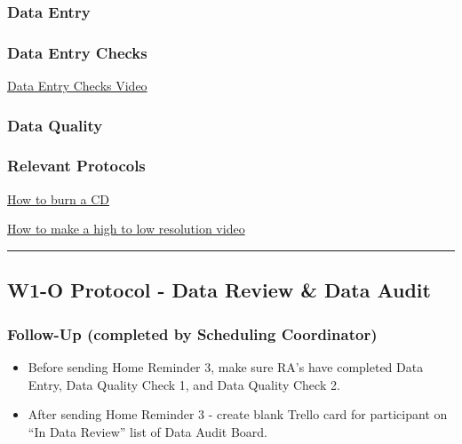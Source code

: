 \documentclass[]{book}
\providecommand{\tightlist}{%
  \setlength{\itemsep}{0pt}\setlength{\parskip}{0pt}}
\begin{document}
\hypertarget{data-entry-3}{%
\subsubsection{Data Entry}\label{data-entry-3}}

\hypertarget{data-entry-checks}{%
\subsubsection{Data Entry Checks}\label{data-entry-checks}}

\href{https://app.box.com/file/805857407548}{Data Entry Checks Video}

\hypertarget{data-quality-2}{%
\subsubsection{Data Quality}\label{data-quality-2}}

\hypertarget{relevant-protocols}{%
\subsubsection{Relevant Protocols}\label{relevant-protocols}}

\href{https://bablab.github.io/wiki_bablab/lab-protocols.html\#burning-cd}{How to burn a CD}

\href{https://bablab.github.io/wiki_bablab/lab-protocols.html\#high-to-low-res-video}{How to make a high to low resolution video}

\begin{center}\rule{0.5\linewidth}{0.5pt}\end{center}

\hypertarget{w1-o-protocol---data-review-data-audit}{%
\subsection{W1-O Protocol - Data Review \& Data Audit}\label{w1-o-protocol---data-review-data-audit}}

\hypertarget{follow-up-completed-by-scheduling-coordinator-1}{%
\subsubsection{Follow-Up (completed by Scheduling Coordinator)}\label{follow-up-completed-by-scheduling-coordinator-1}}

\begin{itemize}
\tightlist
\item
  Before sending Home Reminder 3, make sure RA's have completed Data Entry, Data Quality Check 1, and Data Quality Check 2.
\item
  After sending Home Reminder 3 - create blank Trello card for participant on ``In Data Review'' list of Data Audit Board.
\end{itemize}
\end{document}
